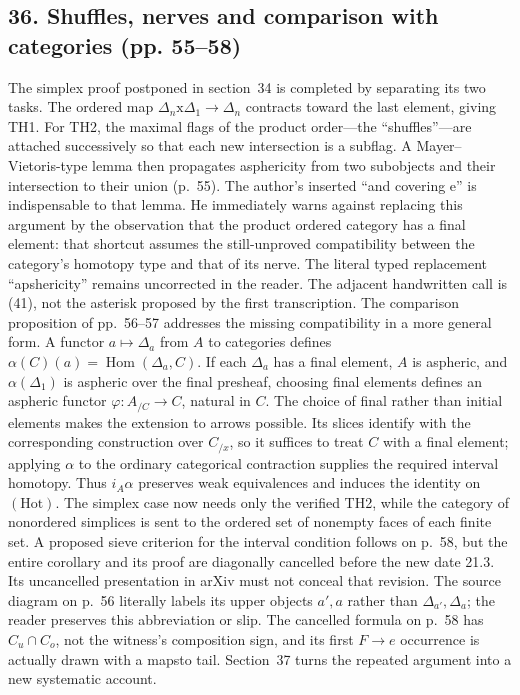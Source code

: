 \documentclass[10pt,oneside]{book}
\begin{document}
\subsection*{36. Shuffles, nerves and comparison with categories (pp. 55--58)}
The simplex proof postponed in section~34 is completed by separating its two tasks. The ordered map $\Delta_n\mathrm{x}\Delta_1\to\Delta_n$ contracts toward the last element, giving TH1. For TH2, the maximal flags of the product order---the ``shuffles''---are attached successively so that each new intersection is a subflag. A Mayer--Vietoris-type lemma then propagates asphericity from two subobjects and their intersection to their union (p.~55). The author's inserted ``and covering e'' is indispensable to that lemma. He immediately warns against replacing this argument by the observation that the product ordered category has a final element: that shortcut assumes the still-unproved compatibility between the category's homotopy type and that of its nerve. The literal typed replacement ``apshericity'' remains uncorrected in the reader. The adjacent handwritten call is (41), not the asterisk proposed by the first transcription. The comparison proposition of pp.~56--57 addresses the missing compatibility in a more general form. A functor $a\mapsto\Delta_a$ from $A$ to categories defines $\alpha(C)(a)=\operatorname{Hom}(\Delta_a,C)$. If each $\Delta_a$ has a final element, $A$ is aspheric, and $\alpha(\Delta_1)$ is aspheric over the final presheaf, choosing final elements defines an aspheric functor $\varphi:A_{/C}\to C$, natural in $C$. The choice of final rather than initial elements makes the extension to arrows possible. Its slices identify with the corresponding construction over $C_{/x}$, so it suffices to treat $C$ with a final element; applying $\alpha$ to the ordinary categorical contraction supplies the required interval homotopy. Thus $i_A\alpha$ preserves weak equivalences and induces the identity on $(\mathrm{Hot})$. The simplex case now needs only the verified TH2, while the category of nonordered simplices is sent to the ordered set of nonempty faces of each finite set. A proposed sieve criterion for the interval condition follows on p.~58, but the entire corollary and its proof are diagonally cancelled before the new date 21.3. Its uncancelled presentation in arXiv must not conceal that revision. The source diagram on p.~56 literally labels its upper objects $a',a$ rather than $\Delta_{a'},\Delta_a$; the reader preserves this abbreviation or slip. The cancelled formula on p.~58 has $C_u\cap C_o$, not the witness's composition sign, and its first $F\to e$ occurrence is actually drawn with a mapsto tail. Section~37 turns the repeated argument into a new systematic account.
\end{document}
